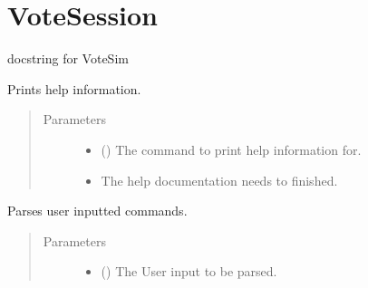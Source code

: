 \documentclass[letterpaper,10pt,english]{sphinxmanual}
\begin{document}
\chapter{VoteSession}
\label{\detokenize{index:votesession}}

\begin{fulllineitems}
\label{\detokenize{index:VoteSession.VoteSim}}
docstring for VoteSim

\begin{fulllineitems}
\label{\detokenize{index:VoteSession.VoteSim.help}}
Prints help information.
\begin{quote}\begin{description}
\item[{Parameters}] \leavevmode\begin{itemize}
\item {} 
 () \textendash{} The command to print help information for.

\item {} 
 \textendash{} The help documentation needs to finished.

\end{itemize}

\end{description}\end{quote}

\end{fulllineitems}


\begin{fulllineitems}
\label{\detokenize{index:VoteSession.VoteSim.parse}}
Parses user inputted commands.
\begin{quote}\begin{description}
\item[{Parameters}] \leavevmode\begin{itemize}
\item {} 
 () \textendash{} The User input to be parsed.


\end{itemize}
\end{description}
\end{quote}
\end{fulllineitems}
\end{fulllineitems}
\end{document}
